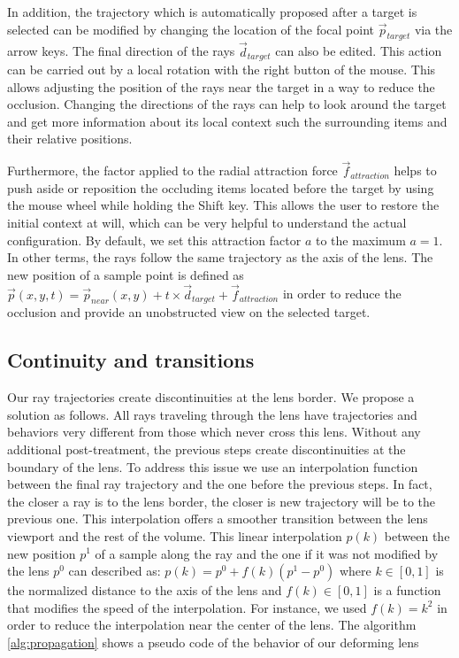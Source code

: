 In addition, the trajectory which is automatically proposed after a target is selected can be modified by changing the location of the focal point $\vec{p}_{target}$ via the arrow keys. The final direction of the rays $\vec{d}_{target}$ can also be edited. This action can be carried out by a local rotation with the right button of the mouse. This allows adjusting the position of the rays near the target in a way to reduce the occlusion. Changing the directions of the rays can help to look around the target and get more information about its local context such the surrounding items and their relative positions.  

Furthermore, the factor applied to the radial attraction force $\vec{f}_{attraction}$  helps to push aside or reposition the occluding items located before the target by using the mouse wheel while holding the Shift key. This allows the user to restore the initial context at will, which can be very helpful to understand the actual configuration. By default, we set this attraction factor $a$ to the maximum $a=1$. In other terms, the rays follow the same trajectory as the axis of the lens. The new position of a sample point is defined as $\vec{p}\left(x,y,t\right) = \vec{p}_{near}\left(x,y\right) + t \times \vec{d}_{target} + \vec{f}_{attraction} $  in order to reduce the occlusion and provide an unobstructed view  on the selected target.

\subsection{Continuity and transitions}
\label{continuity}
%
Our ray trajectories create discontinuities at the lens border. We propose a solution as follows. All rays traveling through the lens have trajectories and behaviors very different from those which never cross this lens. Without any additional post-treatment, the previous steps create discontinuities at the boundary of the lens. To address this issue we use an interpolation function between the final ray trajectory and the one before the previous steps. In fact, the closer a ray is to the lens border, the closer is new trajectory will be to the previous one. This interpolation offers a smoother transition between the lens viewport and the rest of the volume. This linear interpolation $p\left(k\right)$ between the new position $p^{1}$ of a sample along the ray and the one if it was not modified by the lens $p^{0}$ can described as: $p\left(k\right) = p^{0} + f\left(k\right)\left( p^{1} - p^{0} \right)$ where $k \in  \left[0,1\right]$  is the normalized distance to the axis of the lens and $ f\left(k\right)\in  \left[0,1\right]$ is a function that modifies the speed of the interpolation. For instance, we used $ f\left(k\right) = k^2$ in order to reduce the interpolation near the center of the lens.
The algorithm \ref{alg:propagation} shows a pseudo code of the behavior of our deforming lens 


